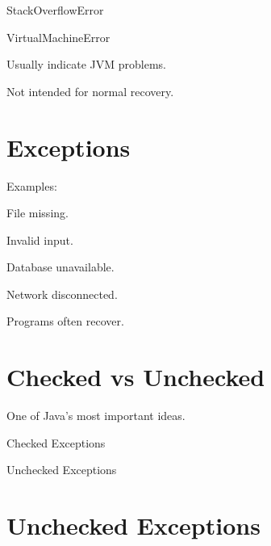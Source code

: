 \documentclass[11pt,a4paper]{book}
\begin{document}
StackOverflowError


VirtualMachineError


Usually indicate JVM problems.


Not intended for normal recovery.


\section{Exceptions}

Examples:


File missing.


Invalid input.


Database unavailable.


Network disconnected.


Programs often recover.


\section{Checked vs Unchecked}

One of Java's most important ideas.


Checked Exceptions


Unchecked Exceptions


\section{Unchecked Exceptions}
\end{document}
